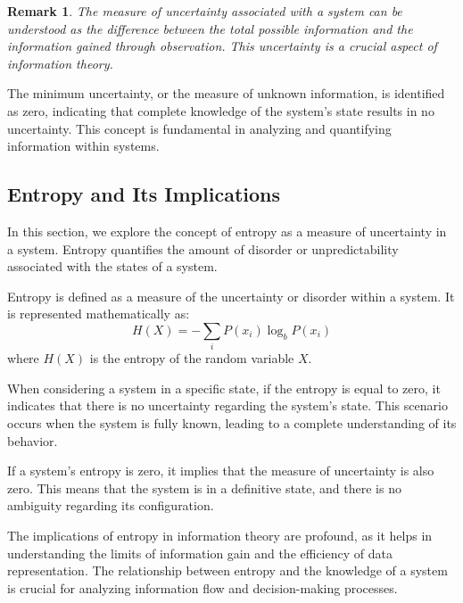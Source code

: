 \documentclass[12pt,a4paper]{article}
\newenvironment{thmbox}[1][]{%
  \begin{tcolorbox}[enhanced, breakable, colback=thmcolor, colframe=blue!50!black, title=#1, fonttitle=\bfseries, arc=3pt, boxrule=0.5pt]
}{\end{tcolorbox}}
\newenvironment{defbox}[1][]{%
  \begin{tcolorbox}[enhanced, breakable, colback=defcolor, colframe=green!50!black, title=#1, fonttitle=\bfseries, arc=3pt, boxrule=0.5pt]
}{\end{tcolorbox}}
\newtheorem{remark}{Remark}[section]
\begin{document}
\begin{remark}
The measure of uncertainty associated with a system can be understood as the difference between the total possible information and the information gained through observation. This uncertainty is a crucial aspect of information theory.
\end{remark}

The minimum uncertainty, or the measure of unknown information, is identified as zero, indicating that complete knowledge of the system's state results in no uncertainty. This concept is fundamental in analyzing and quantifying information within systems.

\subsection{Entropy and Its Implications}
In this section, we explore the concept of entropy as a measure of uncertainty in a system. Entropy quantifies the amount of disorder or unpredictability associated with the states of a system.

\begin{defbox}[Entropy]
Entropy is defined as a measure of the uncertainty or disorder within a system. It is represented mathematically as:
\begin{equation}
H(X) = -\sum_{i} P(x_i) \log_b P(x_i)
\end{equation}
where \( H(X) \) is the entropy of the random variable \( X \).
\end{defbox}

When considering a system in a specific state, if the entropy is equal to zero, it indicates that there is no uncertainty regarding the system's state. This scenario occurs when the system is fully known, leading to a complete understanding of its behavior.

\begin{thmbox}[Entropy in a System]
If a system's entropy is zero, it implies that the measure of uncertainty is also zero. This means that the system is in a definitive state, and there is no ambiguity regarding its configuration.
\end{thmbox}

The implications of entropy in information theory are profound, as it helps in understanding the limits of information gain and the efficiency of data representation. The relationship between entropy and the knowledge of a system is crucial for analyzing information flow and decision-making processes.
\end{document}
